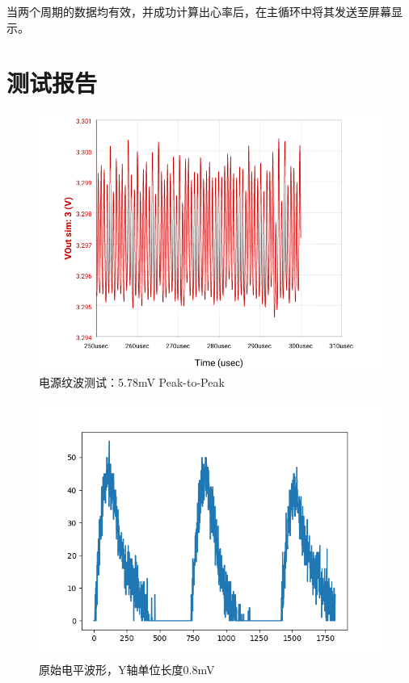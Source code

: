 \documentclass[a4paper]{ctexart}
\begin{document}
	当两个周期的数据均有效，并成功计算出心率后，在主循环中将其发送至屏幕显示。

\newpage
\section{测试报告}

\begin{figure}[H]
	\centering
	\includegraphics[width=1.0\textwidth]{amCharts.png}
	\caption{电源纹波测试：5.78mV Peak-to-Peak}
\end{figure}

\begin{figure}[H]
	\centering
	\includegraphics[width=1.0\textwidth]{ppg.png}
	\caption{原始电平波形，Y轴单位长度0.8mV}
\end{figure}	
\end{document}
